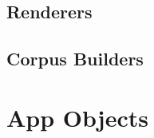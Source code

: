 
\subsection{Renderers}\label{ssec:3-renderers}


\subsection{Corpus Builders}\label{ssec:3-corpusbuilders}


\section{App Objects}\label{ssec:3-app-objects}
